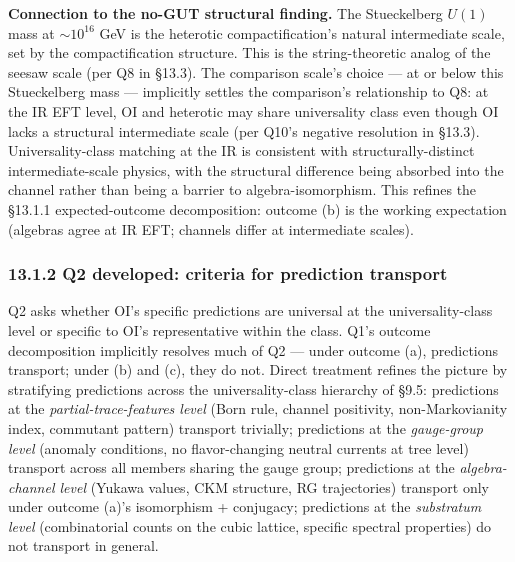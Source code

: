 \documentclass[
]{article}
\begin{document}
\textbf{Connection to the no-GUT structural finding.} The Stueckelberg
\(U(1)\) mass at \(\sim 10^{16}\) GeV is the heterotic
compactification's natural intermediate scale, set by the
compactification structure. This is the string-theoretic analog of the
seesaw scale (per Q8 in §13.3). The comparison scale's choice --- at or
below this Stueckelberg mass --- implicitly settles the comparison's
relationship to Q8: at the IR EFT level, OI and heterotic may share
universality class even though OI lacks a structural intermediate scale
(per Q10's negative resolution in §13.3). Universality-class matching at
the IR is consistent with structurally-distinct intermediate-scale
physics, with the structural difference being absorbed into the channel
rather than being a barrier to algebra-isomorphism. This refines the
§13.1.1 expected-outcome decomposition: outcome (b) is the working
expectation (algebras agree at IR EFT; channels differ at intermediate
scales).

\hypertarget{q2-developed-criteria-for-prediction-transport}{%
\subsubsection{13.1.2 Q2 developed: criteria for prediction
transport}\label{q2-developed-criteria-for-prediction-transport}}

Q2 asks whether OI's specific predictions are universal at the
universality-class level or specific to OI's representative within the
class. Q1's outcome decomposition implicitly resolves much of Q2 ---
under outcome (a), predictions transport; under (b) and (c), they do
not. Direct treatment refines the picture by stratifying predictions
across the universality-class hierarchy of §9.5: predictions at the
\emph{partial-trace-features level} (Born rule, channel positivity,
non-Markovianity index, commutant pattern) transport trivially;
predictions at the \emph{gauge-group level} (anomaly conditions, no
flavor-changing neutral currents at tree level) transport across all
members sharing the gauge group; predictions at the
\emph{algebra-channel level} (Yukawa values, CKM structure, RG
trajectories) transport only under outcome (a)'s isomorphism +
conjugacy; predictions at the \emph{substratum level} (combinatorial
counts on the cubic lattice, specific spectral properties) do not
transport in general.
\end{document}
